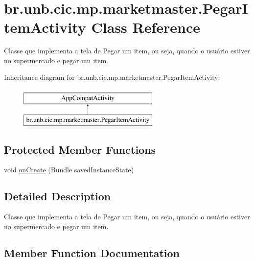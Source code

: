 \hypertarget{classbr_1_1unb_1_1cic_1_1mp_1_1marketmaster_1_1PegarItemActivity}{}\section{br.\+unb.\+cic.\+mp.\+marketmaster.\+Pegar\+Item\+Activity Class Reference}
\label{classbr_1_1unb_1_1cic_1_1mp_1_1marketmaster_1_1PegarItemActivity}


Classe que implementa a tela de Pegar um item, ou seja, quando o usuário estiver no supermercado e pegar um item.  


Inheritance diagram for br.\+unb.\+cic.\+mp.\+marketmaster.\+Pegar\+Item\+Activity\+:\begin{figure}[H]
\begin{center}
\leavevmode
\includegraphics[height=2.000000cm]{classbr_1_1unb_1_1cic_1_1mp_1_1marketmaster_1_1PegarItemActivity}
\end{center}
\end{figure}
\subsection*{Protected Member Functions}
\begin{DoxyCompactItemize}
\item 
void \mbox{\hyperlink{classbr_1_1unb_1_1cic_1_1mp_1_1marketmaster_1_1PegarItemActivity_a853718239f4cdee31852581d9bf03514}{on\+Create}} (Bundle saved\+Instance\+State)
\end{DoxyCompactItemize}


\subsection{Detailed Description}
Classe que implementa a tela de Pegar um item, ou seja, quando o usuário estiver no supermercado e pegar um item. 

\subsection{Member Function Documentation}
\mbox{\label{classbr_1_1unb_1_1cic_1_1mp_1_1marketmaster_1_1PegarItemActivity_a853718239f4cdee31852581d9bf03514}} 
